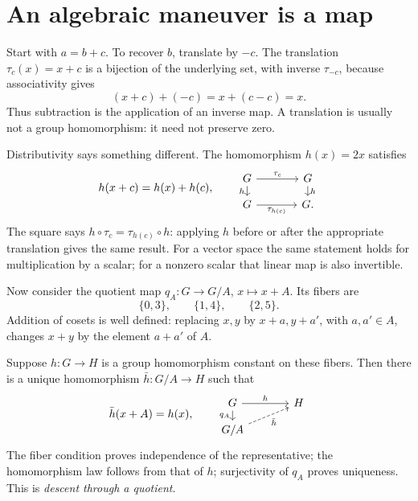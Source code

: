 
\clearpage
\section{An algebraic maneuver is a map}\label{c:maps}
Start with \(a=b+c\). To recover \(b\), translate by \(-c\).
The translation \(\tau_c(x)=x+c\) is a bijection of the underlying set, with
inverse \(\tau_{-c}\), because associativity gives
\[
 (x+c)+(-c)=x+(c-c)=x.
\]
Thus subtraction is the application of an inverse map. A translation is
usually not a group homomorphism: it need not preserve zero.

Distributivity says something different. The homomorphism \(h(x)=2x\)
satisfies
\[
 h(x+c)=h(x)+h(c),\qquad
 \begin{tikzcd}[column sep=large,row sep=small]
 G\arrow[r,"\tau_c"]\arrow[d,"h"']&G\arrow[d,"h"]\\
 G\arrow[r,"\tau_{h(c)}"']&G .
 \end{tikzcd}
\]
The square says \(h\circ\tau_c=\tau_{h(c)}\circ h\): applying \(h\) before
or after the appropriate translation gives the same result.
For a vector space the same statement holds for multiplication by a scalar;
for a nonzero scalar that linear map is also invertible.

Now consider the quotient map \(q_A:G\to G/A\), \(x\mapsto x+A\).
Its fibers are
\[
 \{0,3\},\qquad\{1,4\},\qquad\{2,5\}.
\]
Addition of cosets is well defined: replacing \(x,y\) by \(x+a,y+a'\),
with \(a,a'\in A\), changes \(x+y\) by the element \(a+a'\) of \(A\).

Suppose \(h:G\to H\) is a group homomorphism constant on these fibers.
Then there is a unique homomorphism \(\bar h:G/A\to H\) such that
\[
 \bar h(x+A)=h(x),\qquad
 \begin{tikzcd}[column sep=large,row sep=small]
 G\arrow[r,"h"]\arrow[d,"q_A"']&H\\
 G/A\arrow[ur,dashed,"\bar h"']&
 \end{tikzcd}
\]
The fiber condition proves independence of the representative; the
homomorphism law follows from that of \(h\); surjectivity of \(q_A\) proves
uniqueness. This is \emph{descent through a quotient}.

